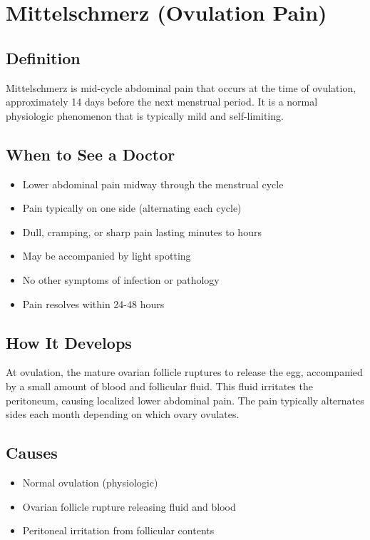 \chapter{Mittelschmerz (Ovulation Pain)}

\section*{Definition}
Mittelschmerz is mid-cycle abdominal pain that occurs at the time of ovulation, approximately 14 days before the next menstrual period. It is a normal physiologic phenomenon that is typically mild and self-limiting.

\section*{When to See a Doctor}
\begin{itemize}
\item Lower abdominal pain midway through the menstrual cycle
\item Pain typically on one side (alternating each cycle)
\item Dull, cramping, or sharp pain lasting minutes to hours
\item May be accompanied by light spotting
\item No other symptoms of infection or pathology
\item Pain resolves within 24-48 hours
\end{itemize}

\section*{How It Develops}
At ovulation, the mature ovarian follicle ruptures to release the egg, accompanied by a small amount of blood and follicular fluid. This fluid irritates the peritoneum, causing localized lower abdominal pain. The pain typically alternates sides each month depending on which ovary ovulates.

\section*{Causes}
\begin{itemize}
\item Normal ovulation (physiologic)
\item Ovarian follicle rupture releasing fluid and blood
\item Peritoneal irritation from follicular contents
\end{itemize}


